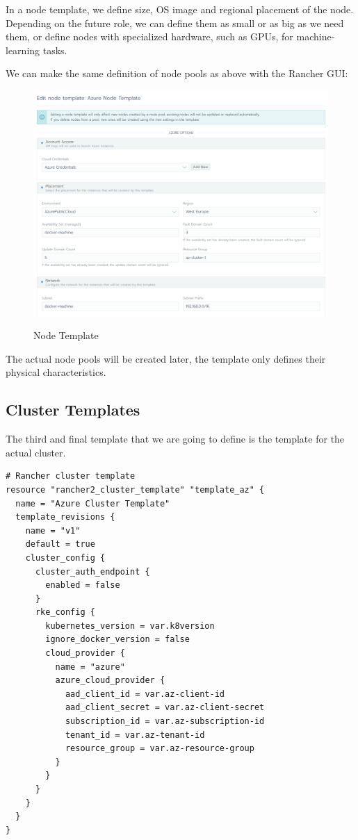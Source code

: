 In a node template, we define size, OS image and regional placement of the node. Depending on the future role, we can define them as small or as big as we need them, or define nodes with specialized hardware, such as GPUs, for machine-learning tasks.

We can make the same definition of node pools as above with the Rancher GUI:

\begin{figure}[H]
\centering
\caption {Node Template}
\includegraphics[width=\linewidth]{images/node-template.png}
\label{fig:nodeTemplate}
\end{figure}

The actual node pools will be created later, the template only defines their physical characteristics.

\subsection{Cluster Templates}

The third and final template that we are going to define is the template for the actual cluster.

\begin{lstlisting}[caption=Cluster Template, frame=single, basicstyle=\ttfamily]
# Rancher cluster template 
resource "rancher2_cluster_template" "template_az" {
  name = "Azure Cluster Template"
  template_revisions {
    name = "v1"
    default = true
    cluster_config {
      cluster_auth_endpoint {
        enabled = false
      }
      rke_config {
        kubernetes_version = var.k8version
        ignore_docker_version = false
        cloud_provider {
          name = "azure"
          azure_cloud_provider {
            aad_client_id = var.az-client-id
            aad_client_secret = var.az-client-secret
            subscription_id = var.az-subscription-id
            tenant_id = var.az-tenant-id
            resource_group = var.az-resource-group
          }
        }
      }
    }
  }
}
\end{lstlisting}


